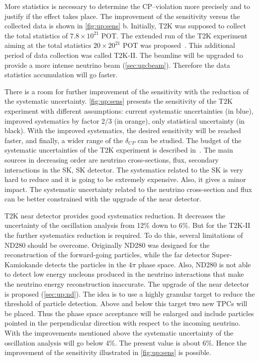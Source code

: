 \documentclass[main.tex]{subfiles}
\begin{document}
More statistics is necessary to determine the CP--violation more precisely and to justify if the effect takes place. The improvement of the sensitivity versus the collected data is shown in \autoref{fig:up:sens} b. Initially, T2K was supposed to collect the total statistics of $7.8\times10^{21}$ POT. The extended run of the T2K experiment aiming at the total statistics $20\times20^{21}$ POT was proposed~\cite{Abe2016e}. This additional period of data collection was called T2K-II. The beamline will be upgraded to provide a more intense neutrino beam (\autoref{sec:up:beam}). Therefore the data statistics accumulation will go faster.

There is a room for further improvement of the sensitivity with the reduction of the systematic uncertainty. \autoref{fig:up:sens} presents the sensitivity of the T2K experiment with different assumptions: current systematic uncertainties (in blue), improved systematics by factor 2/3 (in orange), only statistical uncertainty (in black). With the improved systematics, the desired sensitivity will be reached faster, and finally, a wider range of the $\delta_{CP}$ can be studied. The budget of the systematic uncertainties of the T2K experiment is described in~\cite{Abe2017}. The main sources in decreasing order are neutrino cross-sections, flux, secondary interactions in the SK, SK detector. The systematics related to the SK is very hard to reduce and it is going to be extremely expensive. Also, it gives a minor impact. The systematic uncertainty related to the neutrino cross-section and flux can be better constrained with the upgrade of the near detector.

T2K near detector provides good systematics reduction. It decreases the uncertainty of the oscillation analysis from 12\% down to 6\%. But for the T2K-II the further systematics reduction is required. To do this, several limitations of ND280 should be overcome. Originally ND280 was designed for the reconstruction of the forward-going particles, while the far detector Super-Kamiokande detects the particles in the $4\pi$ phase space. Also, ND280 is not able to detect low energy nucleons produced in the neutrino interactions that make the neutrino energy reconstruction inaccurate. The upgrade of the near detector is proposed (\autoref{sec:up:nd}). The idea is to use a highly granular target to reduce the threshold of particle detection. Above and below this target two new TPCs will be placed. Thus the phase space acceptance will be enlarged and include particles pointed in the perpendicular direction with respect to the incoming neutrino. With the improvements mentioned above the systematic uncertainty of the oscillation analysis will go below 4\%. The present value is about 6\%. Hence the improvement of the sensitivity illustrated in \autoref{fig:up:sens} is possible.
\end{document}
